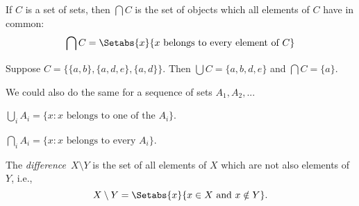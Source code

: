 \documentclass[../../include/open-logic-section]{subfiles}
\begin{document}
\begin{defn}
If $C$ is a set of sets, then $\bigcap C$ is the set of objects which
all elements of $C$ have in common:
\[
\bigcap C = \Setabs{x}{x \text{ belongs to every element of } C}
\]
\end{defn}

\begin{ex}
Suppose $C = \{ \{ a, b \}, \{ a, d, e \}, \{ a, d \} \}$.
Then $\bigcup C = \{ a, b, d, e \}$ and $\bigcap C = \{ a \}$.
\end{ex}

We could also do the same for a sequence of sets $A_1, A_2, ... $

$\bigcup_i A_i = \{ x : x \mbox{ belongs to one of the } A_i \}$.

$\bigcap_i A_i = \{ x : x \mbox{ belongs to every } A_i \}$.

\begin{defn}
The \emph{difference}~$X \setminus Y$ is the set of all elements of
$X$ which are not also elements of $Y$, i.e.,
\[
X\setminus Y = \Setabs{x}{x\in X \text{ and } x \notin Y}.
\]
\end{defn}
\end{document}
